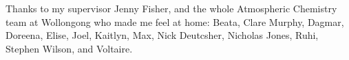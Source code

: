 \begin{acknowledgements}
  \addchaptertocentry{\acknowledgementname} %
  
  Thanks to my supervisor Jenny Fisher, and the whole Atmospheric Chemistry team at Wollongong who made me feel at home: Beata, Clare Murphy, Dagmar, Doreena, Elise, Joel, Kaitlyn, Max, Nick Deutcsher, Nicholas Jones, Ruhi, Stephen Wilson, and Voltaire. 


\end{acknowledgements}